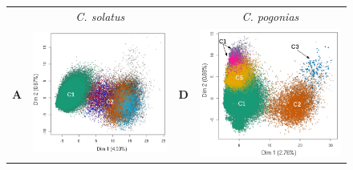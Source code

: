 \documentclass[12pt,a4paper]{article}
\begin{document}
		\begin{figure}	
			\begin{tabular}{cc|cc}
				  & \textit{C. solatus} &  &  \textit{C. pogonias}\\
		\textbf{A} & \includegraphics[scale=0.35]{img/solatus_ACP1.png} & \textbf{D} & \includegraphics[scale=0.35]{img/pogonias_ACP1.png} \\

\end{tabular}
\end{figure}
\end{document}
